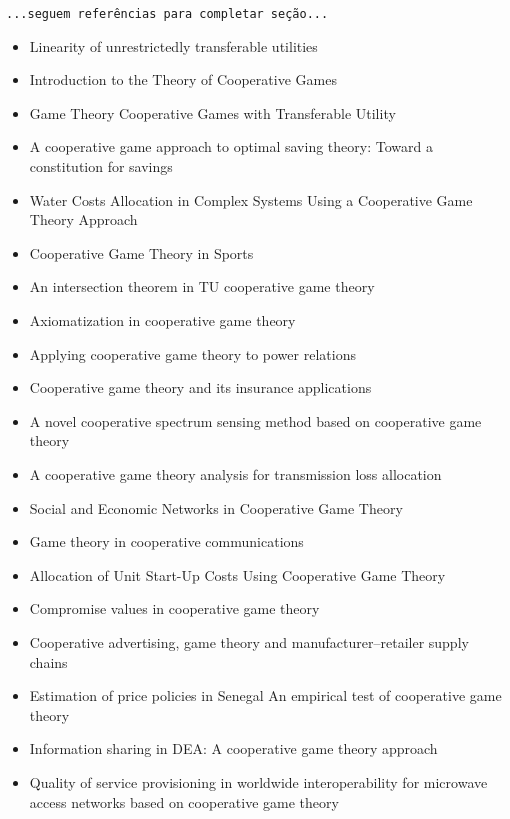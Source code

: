 \documentclass[
	article,			        %
	11pt,				          %
	oneside,			        %
	a4paper,			        %
	english,			        %
	brazil,				        %
	sumario=tradicional
]{abntex2}\usepackage[]{graphicx}\usepackage[]{color}
\begin{document}
  \texttt{\color{red}...seguem referências para completar seção...}
  \begin{itemize}
    \item Linearity of unrestrictedly transferable utilities \cite{Aumann.1960}
    \item Introduction to the Theory of Cooperative Games \cite{Peleg.2007}
    \item Game Theory Cooperative Games with Transferable Utility \cite{Peters.2008}
    \item A cooperative game approach to optimal saving theory: Toward a constitution for savings \cite{Forte.1994}
    \item Water Costs Allocation in Complex Systems Using a Cooperative Game Theory Approach \cite{Sechi.2013}
    \item Cooperative Game Theory in Sports \cite{Manuel.2013}
    \item An intersection theorem in TU cooperative game theory \cite{Albeniz.2004}
    \item Axiomatization in cooperative game theory \cite{yakov.2005}
    \item Applying cooperative game theory to power relations \cite{Wiese.2009}
    \item Cooperative game theory and its insurance applications \cite{Lemaire.1993}
    \item A novel cooperative spectrum sensing method based on cooperative game theory \cite{KaitianCao.2010}
    \item A cooperative game theory analysis for transmission loss allocation \cite{Lima.2008}
    \item Social and Economic Networks in Cooperative Game Theory \cite{Ray.2002}
    \item Game theory in cooperative communications \cite{Yang.2012}
    \item Allocation of Unit Start-Up Costs Using Cooperative Game Theory \cite{Hu.2006}
    \item Compromise values in cooperative game theory \cite{Tijs.1993}
    \item Cooperative advertising, game theory and manufacturer--retailer supply chains \cite{Xie.2006}
    \item Estimation of price policies in Senegal An empirical test of cooperative game theory \cite{Beghin.1991}
    \item Information sharing in DEA: A cooperative game theory approach \cite{Lozano.2012}
    \item Quality of service provisioning in worldwide interoperability for microwave access networks based on cooperative game theory \cite{Jiao.2011}

\end{itemize}
\end{document}
